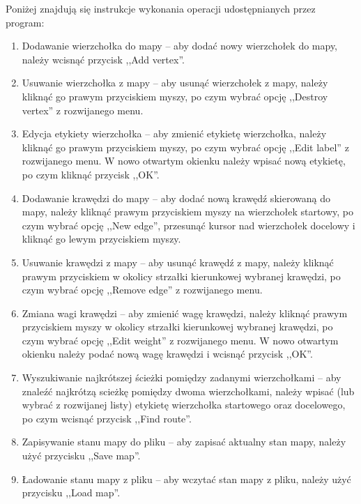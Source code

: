 \documentclass[paper=a4, fontsize=11pt]{scrartcl} %
\begin{document}
\noindent Poniżej znajdują się instrukcje wykonania operacji udostępnianych przez program:
\begin{enumerate}
    \item Dodawanie wierzchołka do mapy -- aby dodać nowy wierzchołek do mapy, należy wcisnąć przycisk ,,Add vertex''.
    \item Usuwanie wierzchołka z mapy -- aby usunąć wierzchołek z mapy, należy kliknąć go prawym przyciskiem myszy,
        po czym wybrać opcję ,,Destroy vertex'' z rozwijanego menu.
    \item Edycja etykiety wierzchołka -- aby zmienić etykietę wierzchołka, należy kliknąć go prawym przyciskiem myszy,
        po czym wybrać opcję ,,Edit label'' z rozwijanego menu. W nowo otwartym okienku należy wpisać nową etykietę, po czym
        kliknąć przycisk ,,OK''.
    \item Dodawanie krawędzi do mapy -- aby dodać nową krawędź skierowaną do mapy, należy kliknąć prawym przyciskiem myszy
        na wierzchołek startowy, po czym wybrać opcję ,,New edge'', przesunąć kursor nad wierzchołek docelowy i kliknąć go lewym
        przyciskiem myszy.
    \item Usuwanie krawędzi z mapy -- aby usunąć krawędź z mapy, należy kliknąć prawym przyciskiem w okolicy strzałki kierunkowej
        wybranej krawędzi, po czym wybrać opcję ,,Remove edge'' z rozwijanego menu.
    \item Zmiana wagi krawędzi -- aby zmienić wagę krawędzi, należy kliknąć prawym przyciskiem myszy w okolicy strzałki kierunkowej
        wybranej krawędzi, po czym wybrać opcję ,,Edit weight'' z rozwijanego menu. W nowo otwartym okienku należy podać nową wagę
        krawędzi i wcisnąć przycisk ,,OK''.
    \item Wyszukiwanie najkrótszej ścieżki pomiędzy zadanymi wierzchołkami -- aby znaleźć najkrótzą scieżkę pomiędzy dwoma wierzchołkami,
        należy wpisać (lub wybrać z rozwijanej listy) etykietę wierzchołka startowego oraz docelowego, po czym wcisnąć przycisk
        ,,Find route''.
    \item Zapisywanie stanu mapy do pliku -- aby zapisać aktualny stan mapy, należy użyć przycisku ,,Save map''.
    \item Ładowanie stanu mapy z pliku -- aby wczytać stan mapy z pliku, należy użyć przycisku ,,Load map''.
\end{enumerate}
\end{document}
